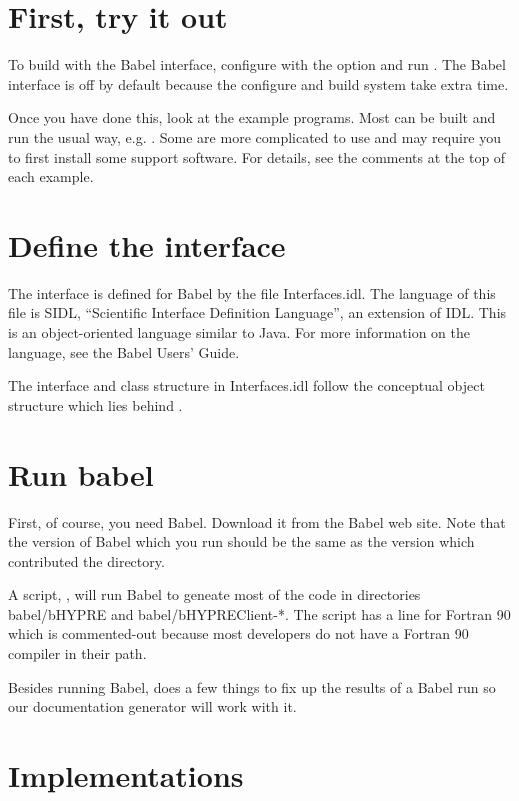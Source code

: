 \section{First, try it out}

To build \hypre{} with the Babel interface, configure with the
 option and run .  The Babel interface
is off by default because the configure and build system take extra
time.

Once you have done this, look at the example programs.  Most can be
built and run the usual way, e.g. .  Some are
more complicated to use and may require you to first install some
support software.  For details, see the comments at the top of each
example.

\section{Define the \hypre{} interface}

The \hypre{} interface is defined for Babel by the file
Interfaces.idl.  The language of this file is SIDL, ``Scientific
Interface Definition Language'', an extension of IDL.  This is an
object-oriented language similar to Java.  For more information on the
language, see the Babel Users' Guide.

The interface and class structure in Interfaces.idl follow the
conceptual object structure which lies behind \hypre{}.

\section{Run babel}

First, of course, you need Babel.  Download it from the Babel web
site.  Note that the version of Babel which you run should be the same
as the version which contributed the  directory.

A script, , will run Babel to geneate most of the
code in directories babel/bHYPRE and babel/bHYPREClient-*.  The script
has a line for Fortran 90 which is commented-out because most \hypre{}
developers do not have a Fortran 90 compiler in their path.

Besides running Babel,  does a few things to fix up
the results of a Babel run so our documentation generator will work
with it.

\section{Implementations}

